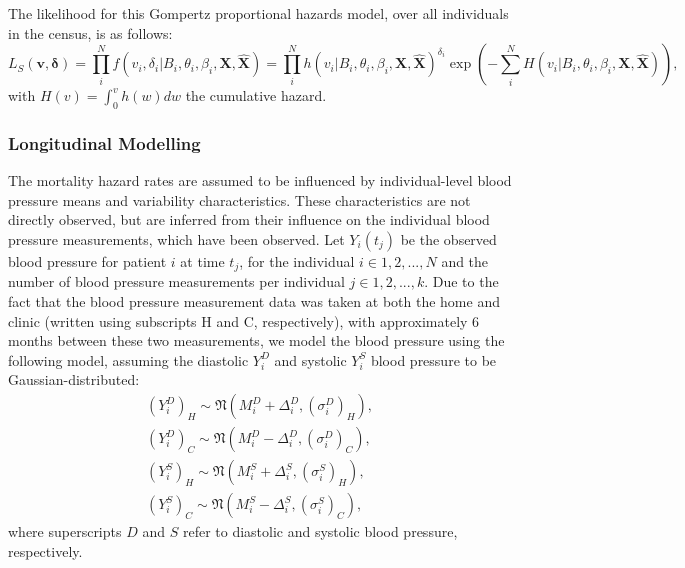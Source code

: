 \documentclass[
]{article}
\begin{document}
The likelihood for this Gompertz proportional hazards model, over all
individuals in the census, is as follows:
\begin{equation}\label{likesurv}
L_S(\boldsymbol{v},\boldsymbol{\delta})=\prod_i^N f(v_i,\delta_i|B_i,\theta_i,\beta_i,\boldsymbol{X},\hat{\boldsymbol{X}})=\prod_i^N h(v_i|B_i,\theta_i,\beta_i,\boldsymbol{X},\hat{\boldsymbol{X}})^{\delta_i} \exp{\left( -\sum_i^N H(v_i|B_i,\theta_i,\beta_i,\boldsymbol{X},\hat{\boldsymbol{X}}) \right)},
\end{equation} with \(H(v)=\int_0^v h(w)dw\) the cumulative hazard.

\hypertarget{longitudinal-modelling}{%
\subsubsection{Longitudinal Modelling}\label{longitudinal-modelling}}

The mortality hazard rates are assumed to be influenced by
individual-level blood pressure means and variability characteristics.
These characteristics are not directly observed, but are inferred from
their influence on the individual blood pressure measurements, which
have been observed. Let \(Y_i(t_j)\) be the observed blood pressure for
patient \(i\) at time \(t_j\), for the individual \(i\in 1,2,...,N\) and
the number of blood pressure measurements per individual
\(j\in 1,2,...,k\). Due to the fact that the blood pressure measurement
data was taken at both the home and clinic (written using subscripts H
and C, respectively), with approximately 6 months between these two
measurements, we model the blood pressure using the following model,
assuming the diastolic \(Y_{i}^D\) and systolic \(Y_{i}^S\) blood
pressure to be Gaussian-distributed: \begin{equation}\label{bp}
\begin{aligned}
  (Y_{i}^D)_{H} \sim \mathfrak{N}(M_i^D+\Delta_i^D,(\sigma_i^D)_H),\\
  (Y_{i}^D)_{C} \sim \mathfrak{N}(M_i^D-\Delta_i^D,(\sigma_i^D)_C),\\
  (Y_{i}^S)_{H} \sim \mathfrak{N}(M_i^S+\Delta_i^S,(\sigma_i^S)_H),\\
  (Y_{i}^S)_{C} \sim \mathfrak{N}(M_i^S-\Delta_i^S,(\sigma_i^S)_C),
\end{aligned}
\end{equation} where superscripts \(D\) and \(S\) refer to diastolic and
systolic blood pressure, respectively.
\end{document}
